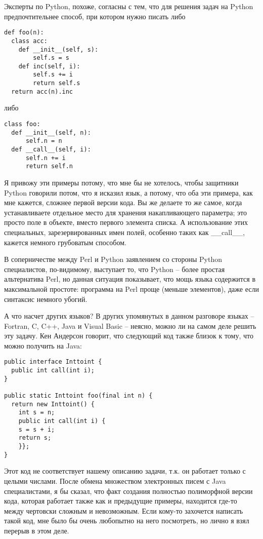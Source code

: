 \documentclass[ebook,12pt,oneside,openany]{memoir}
\begin{document}
Эксперты по Python, похоже, согласны с тем, что для решения задач на
Python предпочтительнее способ, при котором нужно писать либо
\begin{verbatim}
def foo(n):
  class acc:
    def __init__(self, s):
        self.s = s
    def inc(self, i):
        self.s += i
        return self.s
  return acc(n).inc
\end{verbatim}

либо
\begin{verbatim}
class foo:
  def __init__(self, n):
      self.n = n
  def __call__(self, i):
      self.n += i
      return self.n
\end{verbatim}

Я привожу эти примеры потому, что мне бы не хотелось, чтобы защитники
Python говорили потом, что я исказил язык, а потому, что оба эти
примера, как мне кажется, сложнее первой версии кода. Вы же делаете то
же самое, когда устанавливаете отдельное место для хранения
накапливающего параметра; это просто поле в объекте, вместо первого
элемента списка. А использование этих специальных, зарезервированных
имен полей, особенно таких как \_\_call\_\_, кажется немного
грубоватым способом.

В соперничестве между Perl и Python заявлением со стороны Python
специалистов, по-видимому, выступает то, что Python – более простая
альтернатива Perl, но данная ситуация показывает, что мощь языка
содержится в максимальной простоте: программа на Perl проще (меньше
элементов), даже если синтаксис немного убогий.

А что насчет других языков? В других упомянутых в данном разговоре
языках – Fortran, C, C++, Java и Visual Basic – неясно, можно ли на
самом деле решить эту задачу. Кен Андерсон говорит, что следующий код
также близок к тому, что можно получить на Java:
\begin{verbatim}
public interface Inttoint {
  public int call(int i);
}

public static Inttoint foo(final int n) {
  return new Inttoint() {
    int s = n;
    public int call(int i) {
    s = s + i;
    return s;
    }};
}
\end{verbatim}

Этот код не соответствует нашему описанию задачи, т.к. он работает
только с целыми числами. После обмена множеством электронных писем с
Java специалистами, я бы сказал, что факт создания полностью
полиморфной версии кода, которая работает также как и предыдущие
примеры, находится где-то между чертовски сложным и невозможным. Если
кому-то захочется написать такой код, мне было бы очень любопытно на
него посмотреть, но лично я взял перерыв в этом деле.
\end{document}
